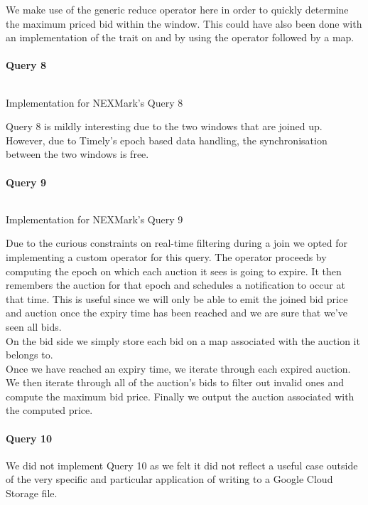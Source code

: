 We make use of the generic reduce operator here in order to quickly determine the maximum priced bid within the window. This could have also been done with an implementation of the  trait on  and by using the  operator followed by a map.

\paragraph{Query 8}
\begin{listing}[H]
  \inputminted[firstline=670,lastline=679]{rust}{benchmarks/src/nexmark.rs}
  \caption{Implementation for NEXMark's Query 8}
  \label{lst:nexmark-query8}
\end{listing}

Query 8 is mildly interesting due to the two windows that are joined up. However, due to Timely's epoch based data handling, the synchronisation between the two windows is free.

\paragraph{Query 9}\label{sec:query9}
\begin{listing}[H]
  \inputminted[firstline=702,lastline=739]{rust}{benchmarks/src/nexmark.rs}
  \caption{Implementation for NEXMark's Query 9}
  \label{lst:nexmark-query9}
\end{listing}

Due to the curious constraints on real-time filtering during a join we opted for implementing a custom operator for this query. The operator proceeds by computing the epoch on which each auction it sees is going to expire. It then remembers the auction for that epoch and schedules a notification to occur at that time. This is useful since we will only be able to emit the joined bid price and auction once the expiry time has been reached and we are sure that we've seen all bids. \\

On the bid side we simply store each bid on a map associated with the auction it belongs to. \\

Once we have reached an expiry time, we iterate through each expired auction. We then iterate through all of the auction's bids to filter out invalid ones and compute the maximum bid price. Finally we output the auction associated with the computed price.

\paragraph{Query 10}
We did not implement Query 10 as we felt it did not reflect a useful case outside of the very specific and particular application of writing to a Google Cloud Storage file.

